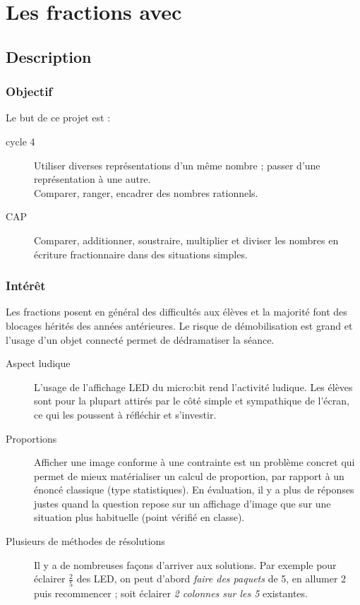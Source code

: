 \section{Les fractions avec \mb}


\pagestyle{mb}

\subsection{Description}

\subsubsection{Objectif}

\begin{formule}
Le but de ce projet est :
\begin{description}
    \item [cycle 4] 
        Utiliser diverses représentations d’un même nombre ; passer d’une représentation à une autre.\\
        Comparer, ranger, encadrer des nombres rationnels.
    \item [\textsc{CAP}] 
        Comparer, additionner, soustraire, multiplier et diviser les nombres en écriture fractionnaire dans des situations simples.
\end{description}

\end{formule}

\subsubsection{Intérêt}
Les fractions posent en général des difficultés aux élèves et la majorité font des blocages hérités des années antérieures. Le risque de démobilisation est grand et l'usage d'un objet connecté permet de dédramatiser la séance.

\begin{description}
    \item [Aspect ludique] L'usage de l'affichage LED du micro:bit rend l'activité ludique. Les élèves sont pour la plupart attirés par le côté simple et sympathique de l'écran, ce qui les poussent à réfléchir et s'investir.    
    \item [Proportions] Afficher une image conforme à une contrainte est un problème concret qui permet de mieux matérialiser un calcul de proportion, par rapport à un énoncé classique (type statistiques). En évaluation, il y a plus de réponses justes quand la question repose sur un affichage d'image que sur une situation plus habituelle (point vérifié en classe).
    \item [Plusieurs de méthodes de résolutions] Il y a de nombreuses façons d'arriver aux solutions. Par exemple pour éclairer $\frac{2}{5}$ des LED, on peut d'abord \emph{faire des paquets} de 5, en allumer 2 puis recommencer ; soit éclairer \emph{2 colonnes sur les 5} existantes.
\end{description}


